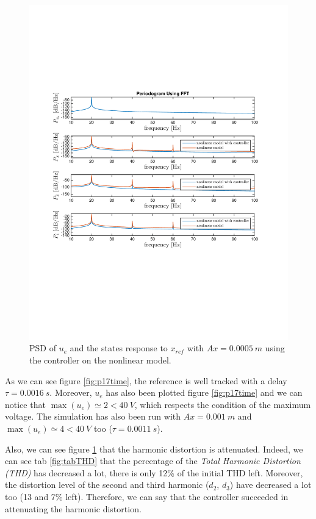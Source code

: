 \begin{figure}[H]
 \centering 
 \includegraphics[trim=0cm 7cm 0cm 7cm, clip=true, totalheight=0.35\textheight, angle=0]{figures/p17freq.pdf}
 \caption{PSD of $u_e$ and the states response to $x_{ref}$ with $Ax = 0.0005\ m$ using the controller on the nonlinear model.}
 \label{fig:p17freq}
\end{figure}

As we can see figure \ref{fig:p17time}, the reference is well tracked with a delay $\tau = 0.0016\ s$. Moreover, $u_e$ has also been plotted figure \ref{fig:p17time} and we can notice that $\max(u_e) \simeq 2 < 40\ V$, which respects the condition of the maximum voltage. The simulation has also been run with $Ax = 0.001\ m$ and $\max(u_e) \simeq 4 < 40\ V$ too ($\tau = 0.0011\ s$).

Also, we can see figure \ref{fig:p17freq} that the harmonic distortion is attenuated. Indeed, we can see tab \ref{fig:tabTHD} that the percentage of the \textit{Total Harmonic Distortion (THD)} has decreased a lot, there is only 12\% of the initial THD left. Moreover, the distortion level of the second and third harmonic ($d_2$, $d_3$) have decreased a lot too (13 and 7\% left). Therefore, we can say that the controller succeeded in attenuating the harmonic distortion.

